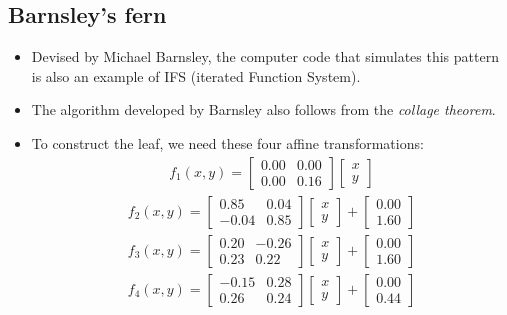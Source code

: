 \documentclass[a0,portrait]{a0poster}
\begin{document}
\begin{multicols}{3}
\section*{Barnsley's fern}
\begin{itemize}
\item Devised by Michael Barnsley, the computer code that simulates this pattern is also an example of IFS (iterated Function System).
\item The algorithm developed by Barnsley also follows from the \textit{collage theorem}.
\item To construct the leaf, we need these four affine transformations:\\
\begin{gather}
f_1(x, y)=\begin{bmatrix}0.00 & 0.00 \\ 0.00 & 0.16 \end{bmatrix}\begin{bmatrix}x\\y\end{bmatrix}
\end{gather}
\begin{gather}
f_2(x, y)=\begin{bmatrix}0.85 & 0.04 \\ -0.04 & 0.85 \end{bmatrix}\begin{bmatrix}x\\y\end{bmatrix} + \begin{bmatrix}0.00\\1.60\end{bmatrix}
\end{gather}
\begin{gather}
f_3(x, y)=\begin{bmatrix}0.20 & -0.26 \\ 0.23 & 0.22 \end{bmatrix}\begin{bmatrix}x\\y\end{bmatrix} + \begin{bmatrix}0.00\\1.60\end{bmatrix}
\end{gather}
\begin{gather}
f_4(x, y)=\begin{bmatrix}-0.15 & 0.28 \\ 0.26 & 0.24 \end{bmatrix}\begin{bmatrix}x\\y\end{bmatrix} + \begin{bmatrix}0.00\\0.44\end{bmatrix}

\end{gather}
\end{itemize}
\end{multicols}
\end{document}
